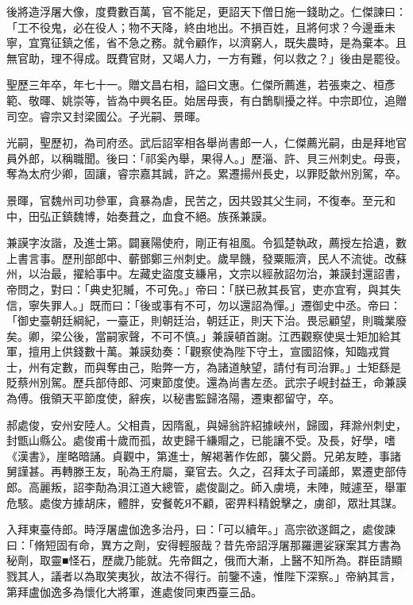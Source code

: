 \begin{pinyinscope}
 後將造浮屠大像，度費數百萬，官不能足，更詔天下僧日施一錢助之。仁傑諫曰：「工不役鬼，必在役人；物不天降，終由地出。不損百姓，且將何求？今邊垂未寧，宜寬征鎮之傜，省不急之務。就令顧作，以濟窮人，既失農時，是為棄本。且無官助，理不得成。既費官財，又竭人力，一方有難，何以救之？」後由是罷役。



 聖歷三年卒，年七十一。贈文昌右相，謚曰文惠。仁傑所薦進，若張柬之、桓彥範、敬暉、姚崇等，皆為中興名臣。始居母喪，有白鵲馴擾之祥。中宗即位，追贈司空。睿宗又封梁國公。子光嗣、景暉。



 光嗣，聖歷初，為司府丞。武后詔宰相各舉尚書郎一人，仁傑薦光嗣，由是拜地官員外郎，以稱職聞。後曰：「祁奚內舉，果得人。」歷淄、許、貝三州刺史。母喪，奪為太府少卿，固讓，睿宗嘉其誠，許之。累遷揚州長史，以罪貶歙州別駕，卒。



 景暉，官魏州司功參軍，貪暴為虐，民苦之，因共毀其父生祠，不復奉。至元和中，田弘正鎮魏博，始奏葺之，血食不絕。族孫兼謨。



 兼謨字汝諧，及進士第。闢襄陽使府，剛正有祖風。令狐楚執政，薦授左拾遺，數上書言事。歷刑部郎中、蘄鄧鄭三州刺史。歲旱饑，發粟賑濟，民人不流徙。改蘇州，以治最，擢給事中。左藏史盜度支縑帛，文宗以經赦詔勿治，兼謨封還詔書，帝問之，對曰：「典史犯贓，不可免。」帝曰：「朕已赦其長官，吏亦宜宥，與其失信，寧失罪人。」既而曰：「後或事有不可，勿以還詔為憚。」遷御史中丞。帝曰：「御史臺朝廷綱紀，一臺正，則朝廷治，朝廷正，則天下治。畏忌顧望，則職業廢矣。卿，梁公後，當嗣家聲，不可不慎。」兼謨頓首謝。江西觀察使吳士矩加給其軍，擅用上供錢數十萬。兼謨劾奏：「觀察使為陛下守土，宣國詔條，知臨戎賞士，州有定數，而與奪由己，貽弊一方，為諸道觖望，請付有司治罪。」士矩繇是貶蔡州別駕。歷兵部侍郎、河東節度使。還為尚書左丞。武宗子峴封益王，命兼謨為傅。俄領天平節度使，辭疾，以秘書監歸洛陽，遷東都留守，卒。



 郝處俊，安州安陸人。父相貴，因隋亂，與婦翁許紹據峽州，歸國，拜滁州刺史，封甑山縣公。處俊甫十歲而孤，故吏歸千縑賵之，已能讓不受。及長，好學，嗜《漢書》，崖略暗誦。貞觀中，第進士，解褐著作佐郎，襲父爵。兄弟友睦，事諸舅謹甚。再轉滕王友，恥為王府屬，棄官去。久之，召拜太子司議郎，累遷吏部侍郎。高麗叛，詔李勣為浿江道大總管，處俊副之。師入虜境，未陣，賊遽至，舉軍危駭。處俊方據胡床，體胖，安餐乾Я不顧，密畀料精銳擊之，虜卻，眾壯其謀。



 入拜東臺侍郎。時浮屠盧伽逸多治丹，曰：「可以續年。」高宗欲遂餌之，處俊諫曰：「脩短固有命，異方之劑，安得輕服哉？昔先帝詔浮屠那羅邇娑寐案其方書為秘劑，取靈■怪石，歷歲乃能就。先帝餌之，俄而大漸，上醫不知所為。群臣請顯戮其人，議者以為取笑夷狄，故法不得行。前鑒不遠，惟陛下深察。」帝納其言，第拜盧伽逸多為懷化大將軍，進處俊同東西臺三品。




\end{pinyinscope}
